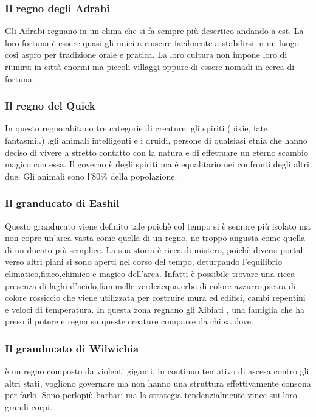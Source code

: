 \documentclass[a4paper,12pt]{book}
\begin{document}
\subsubsection{Il regno degli Adrabi}

Gli Adrabi regnano in un clima che si fa sempre più desertico andando a est.
La loro fortuna è essere quasi gli unici a riuscire facilmente a stabilirsi in un luogo così aspro per tradizione orale e pratica.
La loro cultura non impone loro di riunirsi in città enormi ma piccoli villaggi oppure di essere nomadi in cerca di fortuna.

\subsubsection{Il regno del Quick}

In questo regno abitano tre categorie di creature: gli spiriti (pixie, fate, fantasmi..) ,gli animali intelligenti e i druidi, persone di qualsiasi etnia che hanno deciso di vivere a stretto contatto con la natura e di effettuare un eterno scambio magico con essa.
Il governo è degli spiriti ma è equalitario nei confronti degli altri due. Gli animali sono l'80\% della popolazione.

\subsubsection{Il granducato di Eashil}

Questo granducato viene definito tale poichè col tempo si è sempre più isolato ma non copre un'area vasta come quella di un regno, ne troppo angusta come quella di un ducato più semplice.
La sua storia è ricca di mistero, poichè diversi portali verso altri piani si sono aperti nel corso del tempo, deturpando l'equilibrio climatico,fisico,chimico e magico dell'area.
Infatti è possibile trovare una ricca presenza di laghi d'acido,fiammelle verdeacqua,erbe di colore azzurro,pietra di colore rossiccio che viene utilizzata per costruire mura ed edifici, cambi repentini e veloci di temperatura.
In questa zona regnano gli Xibiati , una famiglia che ha preso il potere e regna su queste creature comparse da chi sa dove.

\subsubsection{Il granducato di Wilwichia}

è un regno composto da violenti giganti, in continuo tentativo di ascesa contro gli altri stati, vogliono governare ma non hanno una struttura effettivamente consona per farlo. Sono perlopiù barbari ma la strategia tendenzialmente vince sui loro grandi corpi.
\end{document}
